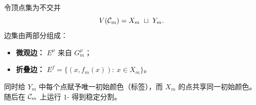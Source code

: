 \begin{definition}
令顶点集为不交并
\[
V(\Clo_m)=X_m\ \sqcup\ Y_m.
\]
边集由两部分组成：
\begin{itemize}
  \item \textbf{微观边：} $E^{\mu}$ 来自 $G_m^{\mu}$；
  \item \textbf{折叠边：} $E^{f}=\{(x,f_m(x)):\ x\in X_m\}$。
\end{itemize}
同时给 $Y_m$ 中每个点赋予唯一初始颜色（标签），而 $X_m$ 的点共享同一初始颜色。随后在 $\mathcal{C}_m$ 上运行 $1$-\WL{} 得到稳定分割。
\end{definition}

